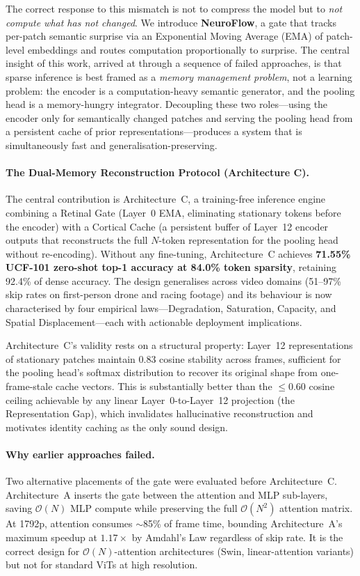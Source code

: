 \documentclass{article}
\begin{document}
The correct response to this mismatch is not to compress the model but
to \emph{not compute what has not changed}. We introduce \textbf{NeuroFlow},
a gate that tracks per-patch semantic surprise via an Exponential Moving
Average (EMA) of patch-level embeddings and routes computation
proportionally to surprise. The central insight of this work, arrived at
through a sequence of failed approaches, is that sparse inference is
best framed as a \emph{memory management problem}, not a learning problem:
the encoder is a computation-heavy semantic generator, and the pooling
head is a memory-hungry integrator. Decoupling these two roles---using
the encoder only for semantically changed patches and serving the pooling
head from a persistent cache of prior representations---produces a system
that is simultaneously fast and generalisation-preserving.

\paragraph{The Dual-Memory Reconstruction Protocol (Architecture C).}
The central contribution is Architecture~C, a training-free inference
engine combining a Retinal Gate (Layer~0 EMA, eliminating stationary
tokens before the encoder) with a Cortical Cache (a persistent buffer of
Layer~12 encoder outputs that reconstructs the full $N$-token
representation for the pooling head without re-encoding). Without any
fine-tuning, Architecture~C achieves \textbf{71.55\% UCF-101 zero-shot
top-1 accuracy at 84.0\% token sparsity}, retaining 92.4\% of dense
accuracy. The design generalises across video domains (51--97\% skip
rates on first-person drone and racing footage) and its behaviour is now
characterised by four empirical laws---Degradation, Saturation, Capacity,
and Spatial Displacement---each with actionable deployment implications.

Architecture~C's validity rests on a structural property: Layer~12
representations of stationary patches maintain $0.83$ cosine stability
across frames, sufficient for the pooling head's softmax distribution to
recover its original shape from one-frame-stale cache vectors. This is
substantially better than the $\leq 0.60$ cosine ceiling achievable by
any linear Layer~0-to-Layer~12 projection (the Representation Gap),
which invalidates hallucinative reconstruction and motivates identity
caching as the only sound design.

\paragraph{Why earlier approaches failed.}
Two alternative placements of the gate were evaluated before Architecture~C.
Architecture~A inserts the gate between the attention and MLP sub-layers,
saving $\mathcal{O}(N)$ MLP compute while preserving the full
$\mathcal{O}(N^2)$ attention matrix. At 1792p, attention consumes
$\sim$85\% of frame time, bounding Architecture~A's maximum speedup at
$\mathbf{1.17\times}$ by Amdahl's Law regardless of skip rate. It is the
correct design for $\mathcal{O}(N)$-attention architectures (Swin,
linear-attention variants) but not for standard ViTs at high resolution.
\end{document}
